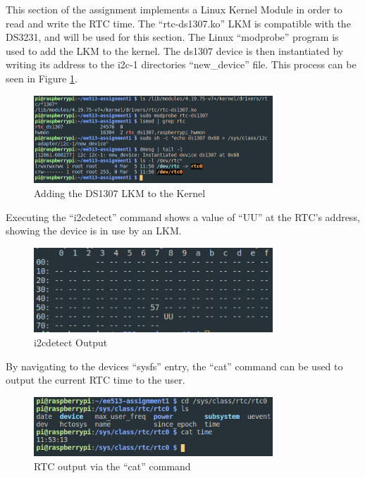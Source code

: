 This section of the assignment implements a Linux Kernel Module in order to read
and write the RTC time. The ``rtc-ds1307.ko'' LKM is compatible with the DS3231,
and will be used for this section. The Linux ``modprobe'' program is used to add
the LKM to the kernel. The ds1307 device is then instantiated by writing its
address to the i2c-1 directories ``new\_device'' file. This process can be seen
in Figure \ref{fig:images-lkm1}.

\begin{figure}[H]
	\centering
	\includegraphics[width=0.8\textwidth]{images/lkm1}
	\caption{Adding the DS1307 LKM to the Kernel}
	\label{fig:images-lkm1}
\end{figure}

Executing the ``i2cdetect'' command shows a value of ``UU'' at the RTC's
address, showing the device is in use by an LKM.

\begin{figure}[H]
	\centering
	\includegraphics[width=0.8\textwidth]{images/lkm2}
	\caption{i2cdetect Output}
	\label{fig:images-lkm2}
\end{figure}

By navigating to the devices ``sysfs'' entry, the ``cat'' command can be used to
output the current RTC time to the user.

\begin{figure}[H]
	\centering
	\includegraphics[width=0.8\textwidth]{images/lkm3}
	\caption{RTC output via the ``cat'' command}
	\label{fig:images-lkm3}
\end{figure}

